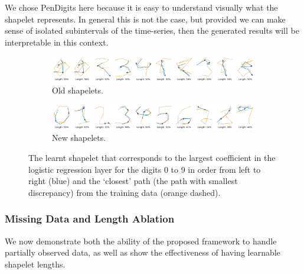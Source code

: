 We chose PenDigits here because it is easy to understand visually what the shapelet represents. In general this is not the case, but provided we can make sense of isolated subintervals of the time-series, then the generated results will be interpretable in this context.
\begin{figure}[ht]
    \begin{subfigure}[b]{\linewidth}
        \centering
        \includegraphics[width=\linewidth]{images/pendigits/old_shapelets_noborder.png}
        \caption{Old shapelets.}
        \label{fig:old_shapelets}
    \end{subfigure}
    \begin{subfigure}[b]{\linewidth}
        \centering
        \includegraphics[width=\linewidth]{images/pendigits/new_shapelets_noborder.png}
        \caption{New shapelets.}
        \label{fig:new_shapelets}
    \end{subfigure}
    \caption{The learnt shapelet that corresponds to the largest coefficient in the logistic regression layer for the digits 0 to 9 in order from left to right (blue) and the `closest' path (the path with smallest discrepancy) from the training data (orange dashed).}
    \label{fig:pendigits}
\end{figure}


\subsubsection{Missing Data and Length Ablation}
We now demonstrate both the ability of the proposed framework to handle partially observed data, as well as show the effectiveness of having learnable shapelet lengths.
\begin{table}[ht]
    \caption{}
    \label{tab:uea_noise}
    \centering
    
\end{table}


